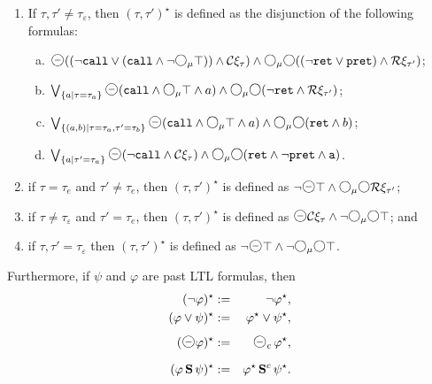 \documentclass{LMCS}
\newcommand{\M}{{\mu}}
\newcommand{\e}{\varepsilon}
\newcommand{\dm}{\Diamond}
\newcommand{\C}{{\mathcal{C}}}
\newcommand{\R}{{\mathcal{R}}}
\renewcommand{\S}{{\mathbf S}}
\newcommand{\next}{\text{\raisebox{1pt}{$\bigcirc$}}}
\theoremstyle{plain}
\theoremstyle{definition}
\newcommand{\prev}{{\text{\Large $\mathbf{\circleddash}$}}}
\newcommand{\pret}{\tt{pret}}
\newcommand{\rett}{{\tt ret}}
\newcommand{\call}{{\tt call}}
\newcommand{\dmm}{\dm_{\M}}
\newcommand{\dmminus}{\dm^-}
\renewcommand{\dm}{\next}
\renewcommand{\dmminus}{\prev}
\renewcommand{\dmm}{\dm_\M}
\begin{document}
{\begin{enumerate}[$\bullet$]
\begin{enumerate}[(1)]
\item If $\tau,\tau' \neq \tau_\e$, then
$(\tau,\tau')^\star$ is defined as the disjunction of the following formulas:

\begin{enumerate}[(a)] 

\item $\dmminus ((\neg \call \vee (\call \wedge \neg \dmm \top))
\wedge \C \xi_{\tau}) \wedge \dmm \dm ((\neg \rett \vee \pret) \wedge
\R \xi_{\tau'}) $; 

\item $\bigvee_{\{a \mid \tau=\tau_a\}}
\dmminus (\call \wedge \dmm \top \wedge a) \wedge \dmm \dm (\neg \rett
\wedge \R \xi_{\tau'})$; 

\item $\bigvee_{\{(a,b) \mid \tau=\tau_a, \tau' = \tau_b\}}
\dmminus (\call \wedge \dmm \top \wedge a) \wedge \dmm \dm (\rett
\wedge b)$;

\item $\bigvee_{\{a \mid \tau' = \tau_a\}} \dmminus (\neg \call \wedge
\C \xi_{\tau}) \wedge \dmm \dm (\rett \wedge \neg \pret \wedge a)$.

\end{enumerate}

\item if $\tau = \tau_e$ and $\tau' \neq \tau_e$, then
$(\tau,\tau')^\star$ is defined as $\neg \dmminus \top \wedge \dmm \dm
\R \xi_{\tau'}$;

\item if $\tau \neq \tau_\e$ and $\tau' = \tau_e$, then
$(\tau,\tau')^\star$ is defined as $\dmminus \C \xi_{\tau} \wedge \neg
\dmm \dm \top$; and

\item if $\tau,\tau' = \tau_\e$ then $(\tau,\tau')^\star$ is
defined as $\neg \dmminus \top \wedge \neg \dmm \dm \top$. 

\end{enumerate} 

Furthermore, if $\psi$
and $\varphi$ are past LTL formulas, then \begin{eqnarray*} (\neg
\varphi)^\star &:=& \neg \varphi^\star,\\ (\varphi \vee \psi)^\star
&:=& \varphi^\star \vee \psi^\star,\\ (\dmminus \varphi)^\star &:=&
\dmminus_c \,\varphi^\star,\\ (\varphi\, \S\, \psi)^\star &:=&
\varphi^\star\, \S^c\, \psi^\star.  \end{eqnarray*} \end{enumerate}

}
\end{document}
